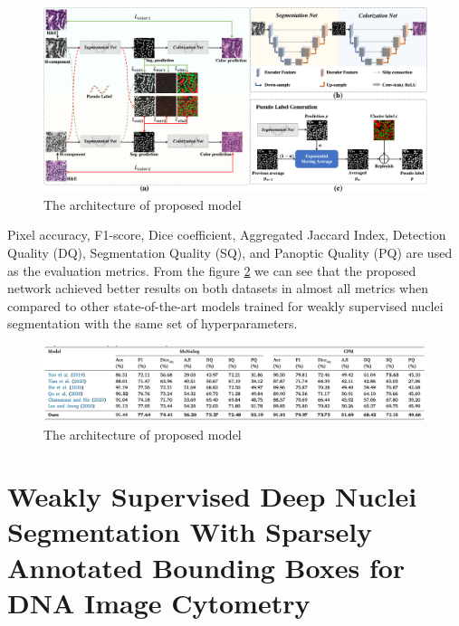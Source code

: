 \begin{figure}[H]
    \begin{centering}
    \includegraphics[width=14cm]{assets/images/rw-selfsup-arch.jpg}
    \par\end{centering}
    \caption{The architecture of proposed model}
    \label{fig:rw-self-sup-arch}
\end{figure}

Pixel accuracy, F1-score, Dice coefficient, Aggregated Jaccard Index, Detection Quality (DQ), Segmentation Quality (SQ), and Panoptic Quality (PQ) are used as the evaluation metrics. From the figure \ref{fig:rw-self-sup-results} we can see that the proposed network achieved better results on both datasets in almost all metrics when compared to other state-of-the-art models trained for weakly supervised nuclei segmentation with the same set of hyperparameters.

\begin{figure}[H]
    \begin{centering}
    \includegraphics[width=14cm]{assets/images/rw-selfsup-results.png}
    \par\end{centering}
    \caption{The architecture of proposed model}
    \label{fig:rw-self-sup-results}
\end{figure}

\section{Weakly Supervised Deep Nuclei Segmentation With Sparsely Annotated Bounding Boxes for DNA Image Cytometry \cite{Liang2023}}
\label{section:related-5}

